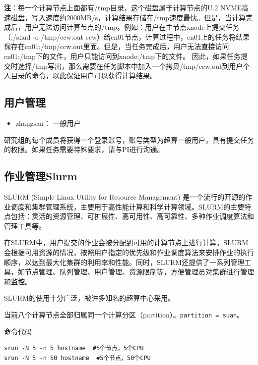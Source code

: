 \documentclass[
]{ctexbook}
\providecommand{\tightlist}{%
  \setlength{\itemsep}{0pt}\setlength{\parskip}{0pt}}
\begin{document}
\textbf{注}：每一个计算节点上面都有/tmp目录，这个磁盘属于计算节点的U.2 NVME高速磁盘，写入速度约2000MB/s，计算结果存储在/tmp速度最快。但是，当计算完成后，用户无法访问计算节点的/tmp。例如：用户在主节点xnode上提交任务（./shud -o /tmp/ccw.out ccw）给cn01节点，计算过程中，cn01上的任务将结果保存在cn01:/tmp/ccw.out里面。但是，当任务完成后，用户无法直接访问cn01:/tmp下的文件，用户只能访问到xnode:/tmp下的文件。 因此，如果任务提交时选择/tmp写出，那么需要在任务脚本中加入一个拷贝/tmp/ccw.out到用户个人目录的命令，以此保证用户可以获得计算结果。

\hypertarget{ux7528ux6237ux7ba1ux7406}{%
\subsection{用户管理}\label{ux7528ux6237ux7ba1ux7406}}

\begin{itemize}
\tightlist
\item
  zhangsan： 一般用户
\end{itemize}

研究组的每个成员将获得一个登录账号，账号类型为超算一般用户，具有提交任务的权限。如果任务需要特殊要求，请与PI进行沟通。

\hypertarget{ux4f5cux4e1aux7ba1ux7406slurm}{%
\subsection{作业管理Slurm}\label{ux4f5cux4e1aux7ba1ux7406slurm}}

SLURM (Simple Linux Utility for Resource Management) 是一个流行的开源的作业调度和集群管理系统，主要用于高性能计算和科学计算领域。SLURM的主要特点包括：灵活的资源管理、可扩展性、高可用性、高可靠性、多种作业调度算法和管理工具等。

在SLURM中，用户提交的作业会被分配到可用的计算节点上进行计算。SLURM会根据可用资源的情况，按照用户指定的优先级和作业调度算法来安排作业的执行顺序，以达到最大化集群的利用率和性能。同时，SLURM还提供了一系列管理工具，如节点管理、队列管理、用户管理、资源限制等，方便管理员对集群进行管理和监控。

SLURM的使用十分广泛，被许多知名的超算中心采用。

当前八个计算节点全部归属同一个计算分区（partition）。\texttt{partition\ =\ suan}。

命令代码

\begin{verbatim}
srun -N 5 -n 5 hostname  #5个节点，5个CPU
srun -N 5 -n 50 hostname  #5个节点，50个CPU
\end{verbatim}
\end{document}
